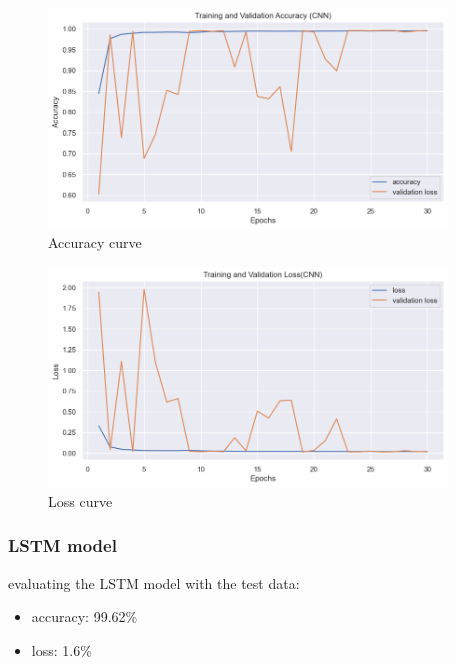 		\begin{figure}[h]
			\centering
			\includegraphics[width=400px]{figures/CNN_training_validation.png}
			\caption{Accuracy curve}
			\label{fig:aa}
		\end{figure}
		\begin{figure}[h]
			\centering
			\includegraphics[width=400px]{figures/CNN_training_validation_loss.png}
			\caption{ Loss curve}
			\label{fig:ff}
		\end{figure}
		


\subsubsection{LSTM model}


evaluating the LSTM model with the test data:
\firmlist
		\begin{itemize}
			\item accuracy: 99.62\%
			\item loss: 1.6\%
		\end{itemize}



